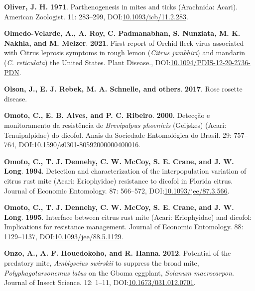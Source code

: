 \documentclass[12pt,final,CPage]{ufthesis}
\newlength{\cslhangindent}
\newenvironment{CSLReferences}[2] %
{%
	\setlength{\parindent}{0pt}
	\ifodd #1 \everypar{\setlength{\hangindent}{\cslhangindent}}\ignorespaces\fi
	\ifnum #2 > 0
	\setlength{\parskip}{#2\baselineskip}
	\fi
}%
{}
\begin{document}
{\begin{CSLReferences}{1}{0}
  \leavevmode{}%
  \textbf{Oliver, J. H.} \textbf{1971}. Parthenogenesis in mites and ticks ({Arachnida}: {Acari}). American Zoologist. 11: 283--299, DOI:\href{https://doi.org/10.1093/icb/11.2.283}{10.1093/icb/11.2.283}.

  \leavevmode{}%
  \textbf{Olmedo-Velarde, A., A. Roy, C. Padmanabhan, S. Nunziata, M. K. Nakhla, and M. Melzer}. \textbf{2021}. First report of {Orchid fleck virus} associated with {Citrus leprosis} symptoms in rough lemon ({\emph{Citrus jambhiri}}) and mandarin ({\emph{C. reticulata}}) the {United States}. Plant Disease., DOI:\href{https://doi.org/10.1094/PDIS-12-20-2736-PDN}{10.1094/PDIS-12-20-2736-PDN}.

  \leavevmode{}%
  \textbf{Olson, J., E. J. Rebek, M. A. Schnelle, and others}. \textbf{2017}. Rose rosette disease.

  \leavevmode{}%
  \textbf{Omoto, C., E. B. Alves, and P. C. Ribeiro}. \textbf{2000}. Detec{ç}{ã}o e monitoramento da resist{ê}ncia de {\emph{Brevipalpus phoenicis}} ({Geijskes}) ({Acari}: {Tenuipalpidae}) do dicofol. Anais da Sociedade Entomol{ó}gica do Brasil. 29: 757--764, DOI:\href{https://doi.org/10.1590/s0301-80592000000400016}{10.1590/s0301-80592000000400016}.

  \leavevmode{}%
  \textbf{Omoto, C., T. J. Dennehy, C. W. McCoy, S. E. Crane, and J. W. Long}. \textbf{1994}. Detection and characterization of the interpopulation variation of citrus rust mite ({Acari}: {Eriophyidae}) resistance to dicofol in {Florida} citrus. Journal of Economic Entomology. 87: 566--572, DOI:\href{https://doi.org/10.1093/jee/87.3.566}{10.1093/jee/87.3.566}.

  \leavevmode{}%
  \textbf{Omoto, C., T. J. Dennehy, C. W. McCoy, S. E. Crane, and J. W. Long}. \textbf{1995}. Interface between citrus rust mite ({Acari}: {Eriophyidae}) and dicofol: Implications for resistance management. Journal of Economic Entomology. 88: 1129--1137, DOI:\href{https://doi.org/10.1093/jee/88.5.1129}{10.1093/jee/88.5.1129}.

  \leavevmode{}%
  \textbf{Onzo, A., A. F. Houedokoho, and R. Hanna}. \textbf{2012}. Potential of the predatory mite, {\emph{Amblyseius swirskii}} to suppress the broad mite, {\emph{Polyphagotarsonemus latus}} on the {Gboma eggplant}, {\emph{Solanum macrocarpon}}. Journal of Insect Science. 12: 1--11, DOI:\href{https://doi.org/10.1673/031.012.0701}{10.1673/031.012.0701}.


\end{CSLReferences}}
\end{document}
